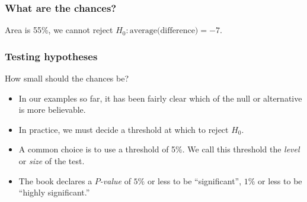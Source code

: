 \documentclass[handout]{beamer}
\begin{document}


   \begin{frame}
   \frametitle{What are the chances?}
   \begin{center}
   \end{center}
   Area is 55\%, we cannot reject $H_0: \text{average(difference)}=-7$.
   \end{frame}


   \begin{frame} \frametitle{Testing hypotheses}

   \begin{block}
   {How small should the chances be?}
   \begin{itemize}

   \item In our examples so far, it has been fairly clear
   which of the null or alternative is more believable.

   \item In practice, we must decide a threshold at which to
   reject $H_0$.

   \item A common choice is to use a threshold of 5\%. We call this
   threshold the {\em level} or {\em size} of the test.

   \item The book declares a {\em \color{orange} $P$-value} of $5\%$ or less to be ``significant'',
   $1\%$ or less to be ``highly significant.''
   \end{itemize}
   \end{block}
   \end{frame}
\end{document}
